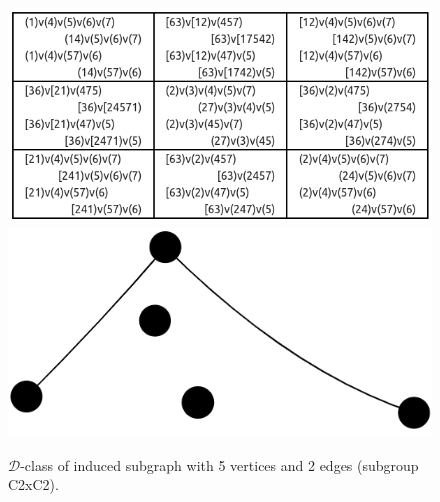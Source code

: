 \begin{appendices}
\begin{figure}[H]
\includegraphics[scale=0.2]{images/x9/x9_5v_2e_1.png}
\includegraphics[scale=0.1]{images/x9/x9_5v_2e_1_vis.png}
\caption{$\mathcal{D}$-class of induced subgraph with 5 vertices and 2 edges (subgroup C2xC2).}
\end{figure}


\end{appendices}

